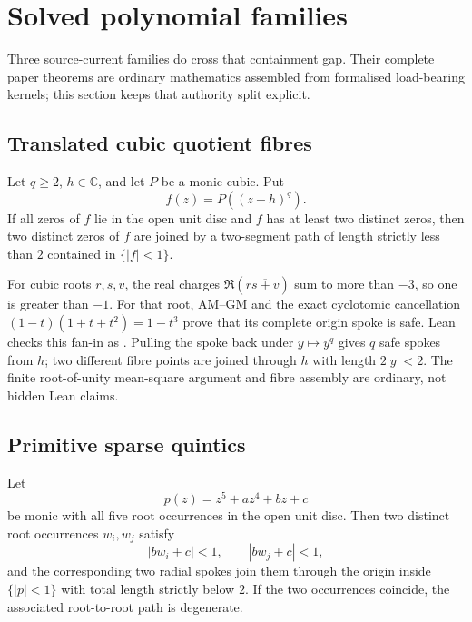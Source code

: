 \documentclass[11pt]{article}
\newcommand{\pdecl}[1]{\emph{\leanlabel{#1}}}
\begin{document}
\section{Solved polynomial families}
\label{sec:solved-families}

Three source-current families do cross that containment gap.  Their complete
paper theorems are ordinary mathematics assembled from formalised
load-bearing kernels; this section keeps that authority split explicit.

\subsection{Translated cubic quotient fibres}

\begin{theorem}
\label{res:cubic-fibres}
Let $q\ge2$, $h\in\mathbb C$, and let $P$ be a monic cubic.  Put
\[
  f(z)=P((z-h)^q).
\]
If all zeros of $f$ lie in the open unit disc and $f$ has at least two
distinct zeros, then two distinct zeros of $f$ are joined by a two-segment
path of length strictly less than $2$ contained in $\{|f|<1\}$.
\end{theorem}

\noindent For cubic roots $r,s,v$, the real charges
$\Re(r\overline{s+v})$ sum to more than $-3$, so one is greater than $-1$.
For that root, AM--GM and the exact cyclotomic cancellation
$(1-t)(1+t+t^2)=1-t^3$ prove that its complete origin spoke is safe.  Lean
checks this fan-in as \pdecl{cubic_has_safe_root_spoke}.  Pulling the spoke
back under $y\mapsto y^q$ gives $q$ safe spokes from $h$; two different fibre
points are joined through $h$ with length $2|y|<2$.  The finite root-of-unity
mean-square argument and fibre assembly are ordinary, not hidden Lean claims.

\subsection{Primitive sparse quintics}

\begin{theorem}
\label{res:primitive-quintic}
Let
\[
  p(z)=z^5+az^4+bz+c
\]
be monic with all five root occurrences in the open unit disc.  Then two
distinct root occurrences $w_i,w_j$ satisfy
\[
  |bw_i+c|<1,
  \qquad
  |bw_j+c|<1,
\]
and the corresponding two radial spokes join them through the origin inside
$\{|p|<1\}$ with total length strictly below $2$.  If the two occurrences
coincide, the associated root-to-root path is degenerate.
\end{theorem}
\end{document}
